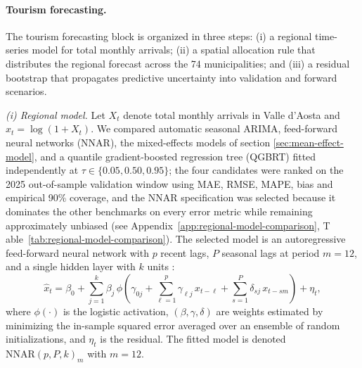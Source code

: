 \documentclass[11pt,a4paper]{article}
\begin{document}
\paragraph{Tourism forecasting.}
The tourism forecasting block is organized in three steps: 
(i) a regional time-series model for total monthly arrivals; 
(ii) a spatial allocation rule that distributes the regional forecast across 
the 74 municipalities; and (iii) a residual bootstrap that propagates 
predictive uncertainty into validation and forward scenarios.

\medskip
\noindent\textit{(i) Regional model.} Let $X_t$ denote total monthly arrivals in Valle d'Aosta 
and $x_t = \log(1+X_t)$. We compared automatic seasonal ARIMA, feed-forward neural networks (NNAR),
 the mixed-effects models of section \ref{sec:mean-effect-model}, and a quantile gradient-boosted regression tree (QGBRT) 
 fitted independently at $\tau\in\{0.05,0.50,0.95\}$; 
 the four candidates were ranked on the 2025 out-of-sample validation window using MAE, RMSE, MAPE, 
 bias and empirical 90\% coverage, and the NNAR specification was selected because
  it dominates the other benchmarks on every error metric while 
  remaining approximately unbiased (see Appendix~\ref{app:regional-model-comparison}, T
  able~\ref{tab:regional-model-comparison}). The selected model is an autoregressive feed-forward neural 
  network with $p$ recent lags, $P$ seasonal lags at period $m=12$, 
  and a single hidden layer with $k$ units \citep{hyndman2021}:
\begin{equation}
\label{eq:nnar}
\widehat{x}_t = \beta_0 + \sum_{j=1}^{k} \beta_j\, \phi\!\left(\gamma_{0j} + \sum_{\ell=1}^{p} \gamma_{\ell j}\, x_{t-\ell} + \sum_{s=1}^{P} \delta_{sj}\, x_{t-s m}\right) + \eta_t,
\end{equation}
where $\phi(\cdot)$ is the logistic activation, $(\beta,\gamma,\delta)$ are weights estimated by minimizing the in-sample squared error averaged over an ensemble of random initializations, and $\eta_t$ is the residual. The fitted model is denoted $\mathrm{NNAR}(p,P,k)_{m}$ with $m=12$.
\end{document}
